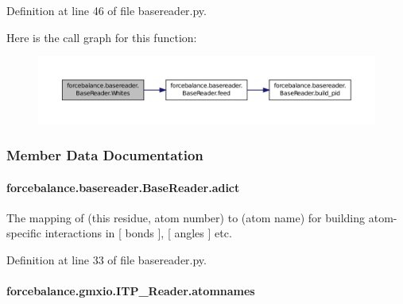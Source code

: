 Definition at line 46 of file basereader.\-py.



Here is the call graph for this function\-:\nopagebreak
\begin{figure}[H]
\begin{center}
\leavevmode
\includegraphics[width=350pt]{classforcebalance_1_1basereader_1_1BaseReader_a2819ab1e523b6ff8e7467e56e3582386_cgraph}
\end{center}
\end{figure}




\subsubsection{Member Data Documentation}
\hypertarget{classforcebalance_1_1basereader_1_1BaseReader_a84a513e0e43145b2fdaf38e73c32f83a}{
\paragraph[{adict}]{\setlength{\rightskip}{0pt plus 5cm}forcebalance.\-basereader.\-Base\-Reader.\-adict\hspace{0.3cm}{\ttfamily [inherited]}}}\label{classforcebalance_1_1basereader_1_1BaseReader_a84a513e0e43145b2fdaf38e73c32f83a}


The mapping of (this residue, atom number) to (atom name) for building atom-\/specific interactions in \mbox{[} bonds \mbox{]}, \mbox{[} angles \mbox{]} etc. 



Definition at line 33 of file basereader.\-py.

\hypertarget{classforcebalance_1_1gmxio_1_1ITP__Reader_a0cbe42a9c0bf233255cfb8dd6ebe102e}{
\paragraph[{atomnames}]{\setlength{\rightskip}{0pt plus 5cm}forcebalance.\-gmxio.\-I\-T\-P\-\_\-\-Reader.\-atomnames}}\label{classforcebalance_1_1gmxio_1_1ITP__Reader_a0cbe42a9c0bf233255cfb8dd6ebe102e}


